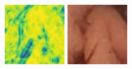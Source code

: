 \documentclass[conference]{IEEEtran}
\begin{document}
\begin{figure}[!t]
        \vfill
        \includegraphics[width=\linewidth]{Figures/906/906_Bicubical_ssim.jpg}
        
    \endminipage\hfill
        \centering
        \includegraphics[width=\linewidth]{Figures/906/906_SRGAN.jpg}
        

\end{figure}
\end{document}
